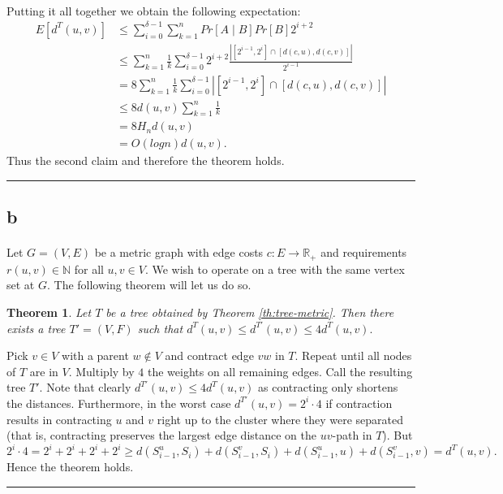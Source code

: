 \documentclass[letterpaper,12pt,oneside,onecolumn]{article}
\newcommand{\N}{\mathbb{N}} \newcommand{\R}{\mathbb{R}}
\newenvironment{proof}{{\bf Proof:  }}{\hfill\rule{2mm}{2mm}}
\newtheorem{theorem}[fact]{Theorem}
\begin{document}
\begin{proof}
\paragraph{}
Putting it all together we obtain the following expectation:
\begin{align*}
E[d^T(u,v)] &\leq \sum_{i=0}^{\delta -1} \sum_{k=1}^n Pr [A \mid B]Pr[B] 2^{i+2} \\
&\leq \sum_{k=1}^n \frac{1}{k} \sum_{i=0}^{\delta -1 }  2^{i+2}\frac{| [2^{i-1},2^i] \cap [d(c,u),d(c,v)]|}{2^{i-1}} \\
&= 8 \sum_{k=1}^n \frac{1}{k} \sum_{i=0}^{\delta -1 }  | [2^{i-1},2^i] \cap [d(c,u),d(c,v)]| \\
&\leq 8 d(u,v) \sum_{k=1}^n \frac{1}{k} \\
&= 8 H_n d(u,v) \\
&= O(log n) d(u,v).
\end{align*}
Thus the second claim and therefore the theorem holds.
\end{proof}

\subsection{b}
\paragraph{}
Let $G = (V,E)$ be a metric graph with edge costs $c:E \rightarrow \R_+$ and requirements $r(u,v) \in \N$ for all $u,v \in V$. We wish to operate on a tree with the same vertex set at $G$. The following theorem will let us do so.
\begin{theorem}
Let $T$ be a tree obtained by Theorem \ref{th:tree-metric}. Then there exists a tree $T' = (V,F)$ such that $d^T(u,v) \leq d^{T'}(u,v) \leq 4 d^T(u,v).$
\end{theorem}
\begin{proof}
Pick $v \in V$ with a parent $w \not \in V$ and contract edge $vw$ in $T$. Repeat until all nodes of $T$ are in $V$. Multiply by $4$ the weights on all remaining edges. Call the resulting tree $T'$. Note that clearly $d^{T'}(u,v) \leq 4d^T(u,v)$ as contracting only shortens the distances. Furthermore, in the worst case $d^{T'}(u,v) = 2^i \cdot 4$ if contraction results in contracting $u$ and $v$ right up to the cluster where they were separated (that is, contracting preserves the largest edge distance on the $uv$-path in $T$). But 
$$2^i \cdot 4 = 2^i + 2^i + 2^i + 2^i \geq d(S^u_{i-1}, S_i) + d(S^v_{i-1}, S_i) +  d(S^u_{i-1}, u) + d(S^v_{i-1}, v) = d^T(u,v).$$
Hence the theorem holds.
\end{proof}
\end{document}
